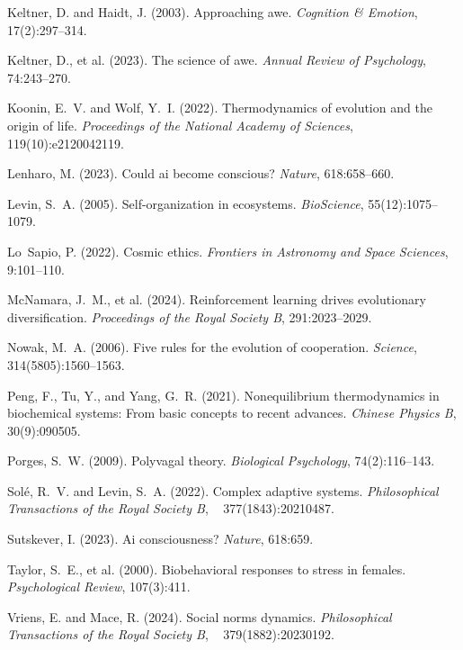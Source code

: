 \documentclass[12pt,openany]{book}
\begin{document}
\begin{thebibliography}{}
Keltner, D. and Haidt, J. (2003).
\newblock Approaching awe.
\newblock \emph{Cognition \& Emotion}, 17(2):297--314.

Keltner, D., et al. (2023).
\newblock The science of awe.
\newblock \emph{Annual Review of Psychology}, 74:243--270.

Koonin, E.~V. and Wolf, Y.~I. (2022).
\newblock Thermodynamics of evolution and the origin of life.
\newblock \emph{Proceedings of the National Academy of Sciences}, 119(10):e2120042119.

Lenharo, M. (2023).
\newblock Could ai become conscious?
\newblock \emph{Nature}, 618:658--660.

Levin, S.~A. (2005).
\newblock Self-organization in ecosystems.
\newblock \emph{BioScience}, 55(12):1075--1079.

Lo~Sapio, P. (2022).
\newblock Cosmic ethics.
\newblock \emph{Frontiers in Astronomy and Space Sciences}, 9:101--110.

McNamara, J.~M., et al. (2024).
\newblock Reinforcement learning drives evolutionary diversification.
\newblock \emph{Proceedings of the Royal Society B}, 291:2023--2029.

Nowak, M.~A. (2006).
\newblock Five rules for the evolution of cooperation.
\newblock \emph{Science}, 314(5805):1560--1563.

Peng, F., Tu, Y., and Yang, G.~R. (2021).
\newblock Nonequilibrium thermodynamics in biochemical systems: From basic concepts to recent advances.
\newblock \emph{Chinese Physics B}, 30(9):090505.

Porges, S.~W. (2009).
\newblock Polyvagal theory.
\newblock \emph{Biological Psychology}, 74(2):116--143.

Sol{\'e}, R.~V. and Levin, S.~A. (2022).
\newblock Complex adaptive systems.
\newblock \emph{Philosophical Transactions of the Royal Society B},
  377(1843):20210487.

Sutskever, I. (2023).
\newblock Ai consciousness?
\newblock \emph{Nature}, 618:659.

Taylor, S.~E., et al. (2000).
\newblock Biobehavioral responses to stress in females.
\newblock \emph{Psychological Review}, 107(3):411.

Vriens, E. and Mace, R. (2024).
\newblock Social norms dynamics.
\newblock \emph{Philosophical Transactions of the Royal Society B},
  379(1882):20230192.

\end{thebibliography}
\end{document}
